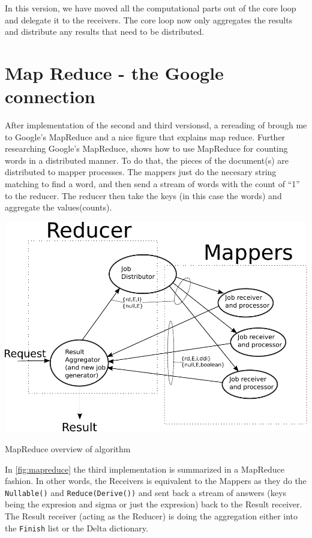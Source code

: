 \documentclass[a4paper,11pt]{report}
\begin{document}
In this version, we have moved all the computational parts
out of the core loop and delegate it to the receivers. The core loop
now only aggregates the results and distribute any results that need
to be distributed.

\section{Map Reduce - the Google connection}


After implementation of the second and third versionsd, a rereading of
\cite{joe:09} brough me to Google's MapReduce and a nice figure
that explains map reduce. Further researching
Google's MapReduce, \cite{Dean} shows how to use MapReduce for
counting words in a distributed manner. To do that, the pieces of the
document(s) are distributed to mapper processes. The mappers just do the
necesary string matching to find a word, and then send a stream
of words with the count of ``1'' to the reducer. The reducer then take
the keys (in this case the words) and aggregate the values(counts).

\begin{Figure}[htb]
	\centering
	\includegraphics[scale=0.8]{MapReduce-process.pdf}
	\caption{MapReduce overview of algorithm}
	\label{fig:mapreduce}
\end{Figure}

In \ref{fig:mapreduce} the third implementation is summarized in a
MapReduce fashion. In other words, the Receivers is equivalent to the
Mappers as they do the \texttt{Nullable()} and
\texttt{Reduce(Derive())} and sent back a stream of answers (keys
being the expresion and sigma or just the expresion) back to the
Result receiver. The Result receiver (acting as the Reducer) is doing
the aggregation either into the \texttt{Finish} list or the Delta
dictionary.
\end{document}
